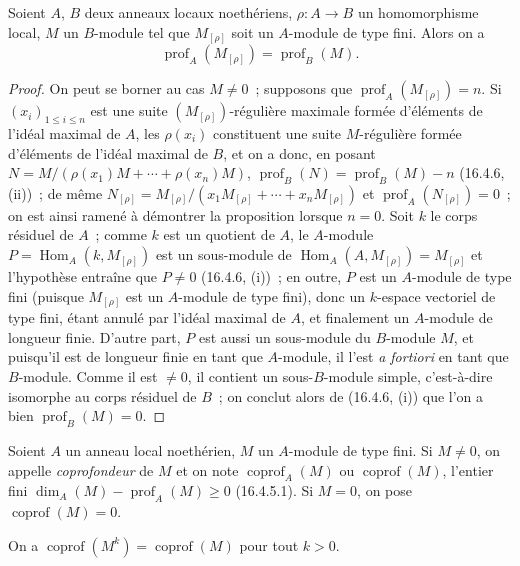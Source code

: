 \begin{proposition}[16.4.8]
\label{0.16.4.8-fr}
Soient $A$, $B$ deux anneaux locaux noethériens,
$\rho:A\to B$ un homomorphisme local, $M$ un $B$-module tel que
$M_{[\rho]}$ soit un $A$-module de type fini. Alors on a
\begin{equation}
\label{0.16.4.8.1-fr}
\tag{16.4.8.1}
  \operatorname{prof}_A(M_{[\rho]})=\operatorname{prof}_B(M).
\end{equation}
\end{proposition}

\begin{proof}
On peut se borner au cas $M\neq0$~; supposons que
$\operatorname{prof}_A(M_{[\rho]})=n$. Si $(x_i)_{1\leq i\leq n}$ est une
suite $(M_{[\rho]})$-régulière maximale formée d'éléments de l'idéal maximal
de $A$, les $\rho(x_i)$ constituent une suite $M$-régulière formée d'éléments
de l'idéal maximal de $B$, et on a donc, en posant
$N=M/(\rho(x_1)M+\cdots+\rho(x_n)M)$,
$\operatorname{prof}_B(N)=\operatorname{prof}_B(M)-n$ (16.4.6, (ii))~; de
même
$N_{[\rho]}=M_{[\rho]}/(x_1M_{[\rho]}+\cdots+x_nM_{[\rho]})$ et
$\operatorname{prof}_A(N_{[\rho]})=0$~; on est ainsi ramené à démontrer la
proposition lorsque $n=0$. Soit $k$ le corps résiduel de $A$~; comme $k$ est
un quotient de $A$, le $A$-module
$P=\operatorname{Hom}_A(k,M_{[\rho]})$ est un sous-module de
$\operatorname{Hom}_A(A,M_{[\rho]})=M_{[\rho]}$ et l'hypothèse entraîne que
$P\neq0$ (16.4.6, (i))~; en outre, $P$ est un $A$-module de type fini
(puisque $M_{[\rho]}$ est un $A$-module de type fini), donc un $k$-espace
vectoriel de type fini, étant annulé par l'idéal maximal de $A$, et finalement
un $A$-module de longueur finie. D'autre part, $P$ est aussi un sous-module du
$B$-module $M$, et puisqu'il est de longueur finie en tant que $A$-module, il
l'est \emph{a fortiori} en tant que $B$-module. Comme il est $\neq0$, il
contient un sous-$B$-module simple, c'est-à-dire isomorphe au corps résiduel de
$B$~; on conclut alors de (16.4.6, (i)) que l'on a bien
$\operatorname{prof}_B(M)=0$.
\end{proof}

\begin{definition}[16.4.9]
\label{0.16.4.9-fr}
Soient $A$ un anneau local noethérien, $M$ un $A$-module de type fini. Si
$M\neq0$, on appelle \emph{coprofondeur} de $M$ et on note
$\operatorname{coprof}_A(M)$ ou $\operatorname{coprof}(M)$, l'entier fini
$\dim_A(M)-\operatorname{prof}_A(M)\geq0$ (16.4.5.1). Si $M=0$, on pose
$\operatorname{coprof}(M)=0$.

On a $\operatorname{coprof}(M^k)=\operatorname{coprof}(M)$ pour tout $k>0$.
\end{definition}


